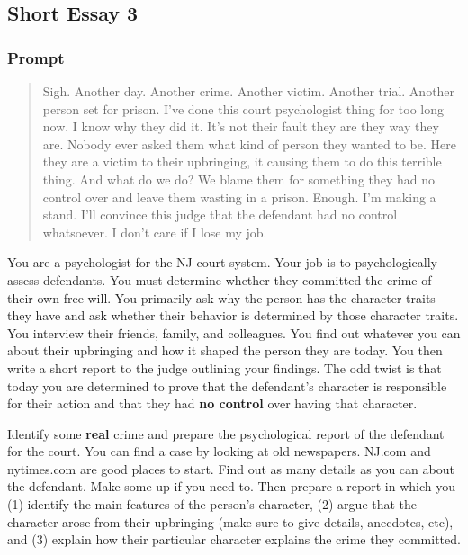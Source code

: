 \documentclass[]{article}
\begin{document}
\subsection{Short Essay 3}\label{short-essay-3}

\subsubsection{Prompt}\label{prompt}

\begin{quote}
Sigh. Another day. Another crime. Another victim. Another trial. Another
person set for prison. I've done this court psychologist thing for too
long now. I know why they did it. It's not their fault they are they way
they are. Nobody ever asked them what kind of person they wanted to be.
Here they are a victim to their upbringing, it causing them to do this
terrible thing. And what do we do? We blame them for something they had
no control over and leave them wasting in a prison. Enough. I'm making a
stand. I'll convince this judge that the defendant had no control
whatsoever. I don't care if I lose my job.
\end{quote}

You are a psychologist for the NJ court system. Your job is to
psychologically assess defendants. You must determine whether they
committed the crime of their own free will. You primarily ask why the
person has the character traits they have and ask whether their behavior
is determined by those character traits. You interview their friends,
family, and colleagues. You find out whatever you can about their
upbringing and how it shaped the person they are today. You then write a
short report to the judge outlining your findings. The odd twist is that
today you are determined to prove that the defendant's character is
responsible for their action and that they had \textbf{no control} over
having that character.

Identify some \textbf{real} crime and prepare the psychological report
of the defendant for the court. You can find a case by looking at old
newspapers. NJ.com and nytimes.com are good places to start. Find out as
many details as you can about the defendant. Make some up if you need
to. Then prepare a report in which you (1) identify the main features of
the person's character, (2) argue that the character arose from their
upbringing (make sure to give details, anecdotes, etc), and (3) explain
how their particular character explains the crime they committed.
\end{document}

